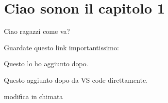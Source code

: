 \chapter{Ciao sonon il capitolo 1}

Ciao ragazzi come va?

Guardate questo link importantissimo: \citep{provaBibliografia}


Questo lo ho aggiunto dopo.

Questo aggiunto dopo da VS code direttamente.


modifica in chimata